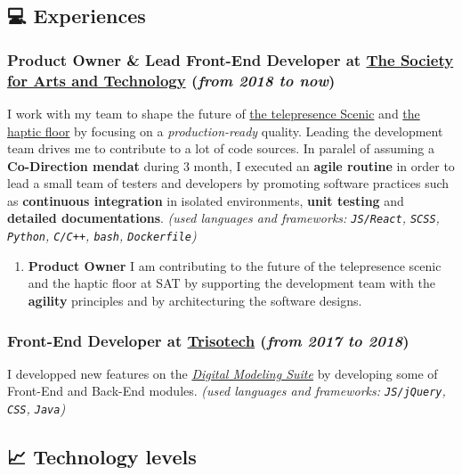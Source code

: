 \documentclass[11pt]{article}
\begin{document}
\subsection{💻 Experiences}
\label{sec:orga751e01}
\subsubsection{\textbf{Product Owner \& Lead Front-End Developer} at \href{https://sat.qc.ca/}{The Society for Arts and Technology} (\emph{from 2018 to now})}
\label{sec:orgd2b2948}
I work with my team to shape the future of \href{https://gitlab.com/sat-mtl/tools/scenic/scenic}{the telepresence Scenic} and \href{https://gitlab.com/sat-mtl/tools/haptic-floor}{the haptic floor} by focusing on a \emph{production-ready} quality. Leading the development team drives me to contribute to a lot of code sources. In paralel of assuming a \textbf{Co-Direction mendat} during 3 month, I executed an \textbf{agile routine} in order to lead a small team of testers and developers by promoting software practices such as \textbf{continuous integration} in isolated environments, \textbf{unit testing} and \textbf{detailed documentations}.
\emph{(used languages and frameworks: \texttt{JS/React}, \texttt{SCSS}, \texttt{Python}, \texttt{C/C++}, \texttt{bash}, \texttt{Dockerfile})}
\begin{enumerate}
\item \textbf{Product Owner}
\label{sec:orgded044d}
I am contributing to the future of the telepresence scenic and the haptic floor  at SAT by supporting the development team with the \textbf{agility} principles and by architecturing the software designs.
\end{enumerate}

\subsubsection{\textbf{Front-End Developer} at \href{https://www.trisotech.com/}{Trisotech} (\emph{from 2017 to 2018})}
\label{sec:orgf48bb73}
I developped new features on the \emph{\href{https://www.trisotech.com/digital-modeling-suite/}{Digital Modeling Suite}} by developing some of Front-End and Back-End modules.
\emph{(used languages and frameworks: \texttt{JS/jQuery}, \texttt{CSS}, \texttt{Java})}

\subsection{📈 Technology levels}
\label{sec:org1b1c244}
\end{document}
